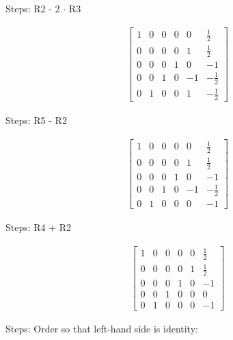 \documentclass[12pt, letterpaper]{../assignment}
\begin{document}
Steps: R2 - 2 $\cdot$ R3

\begin{equation*}
    \begin{aligned}
        \left[\begin{array}{ccccc|c} 
            1 & 0 & 0 & 0 & 0 & \frac{1}{2}\\
            0 & 0 & 0 & 0 & 1 & \frac{1}{2}\\
            0 & 0 & 0 & 1 & 0 & -1\\
            0 & 0 & 1 & 0 & -1 & -\frac{1}{2}\\
            0 & 1 & 0 & 0 & 1 & -\frac{1}{2}
        \end{array}\right]
    \end{aligned}
\end{equation*}

Steps: R5 - R2

\begin{equation*}
    \begin{aligned}
        \left[\begin{array}{ccccc|c} 
            1 & 0 & 0 & 0 & 0 & \frac{1}{2}\\
            0 & 0 & 0 & 0 & 1 & \frac{1}{2}\\
            0 & 0 & 0 & 1 & 0 & -1\\
            0 & 0 & 1 & 0 & -1 & -\frac{1}{2}\\
            0 & 1 & 0 & 0 & 0 & -1
        \end{array}\right]
    \end{aligned}
\end{equation*}

Steps: R4 + R2

\begin{equation*}
    \begin{aligned}
        \left[\begin{array}{ccccc|c} 
            1 & 0 & 0 & 0 & 0 & \frac{1}{2}\\
            0 & 0 & 0 & 0 & 1 & \frac{1}{2}\\
            0 & 0 & 0 & 1 & 0 & -1\\
            0 & 0 & 1 & 0 & 0 & 0\\
            0 & 1 & 0 & 0 & 0 & -1
        \end{array}\right]
    \end{aligned}
\end{equation*}

Steps: Order so that left-hand side is identity:
\end{document}
